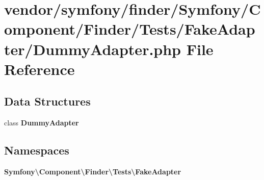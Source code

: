 \section{vendor/symfony/finder/\+Symfony/\+Component/\+Finder/\+Tests/\+Fake\+Adapter/\+Dummy\+Adapter.php File Reference}
\label{_dummy_adapter_8php}
\subsection*{Data Structures}
\begin{DoxyCompactItemize}
\item 
class {\bf Dummy\+Adapter}
\end{DoxyCompactItemize}
\subsection*{Namespaces}
\begin{DoxyCompactItemize}
\item 
 {\bf Symfony\textbackslash{}\+Component\textbackslash{}\+Finder\textbackslash{}\+Tests\textbackslash{}\+Fake\+Adapter}
\end{DoxyCompactItemize}
